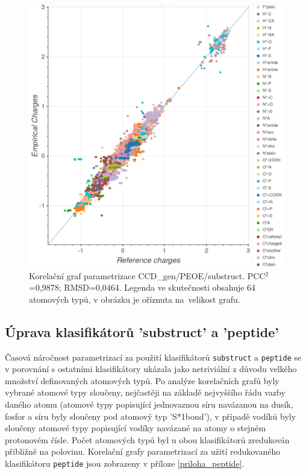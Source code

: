 \vspace*{1cm}
\begin{figure}[H]
\begin{center}
\includegraphics[width=14cm]{pictures/graph_PEOE_substruct.png}
\caption{Korelační graf parametrizace CCD\_gen/PEOE/substruct.  PCC$^2$=0,9878; RMSD=0,0464. Legenda ve skutečnosti obsahuje 64 atomových typů, v obrázku je oříznuta na~velikost grafu.}
\label{graph_corr_PEOE}
\end{center}
\end{figure}

\subsection{Úprava klasifikátorů 'substruct' a 'peptide'}
Časová náročnost parametrizací za použití klasifikátorů \verb|substruct| a \verb|peptide| se v porovnání s ostatními klasifikátory ukázala jako netriviální z důvodu velkého množství definovaných atomových typů. Po analýze korelačních grafů byly vybrané atomové typy sloučeny, nejčastěji na základě nejvyššího řádu vazby daného atomu (atomové typy popisující jednovaznou síru navázanou na dusík, fosfor a síru byly sloučeny pod atomový typ 'S*1bond'), v případě vodíků byly sloučeny atomové typy popisující vodíky navázané na atomy o stejném protonovém čísle. Počet atomových typů byl u obou klasifikátorů zredukován přibližně na polovinu. Korelační grafy parametrizací za užití redukovaného klasifikátoru \verb|peptide| jsou zobrazeny v příloze \ref{priloha_peptide}.

